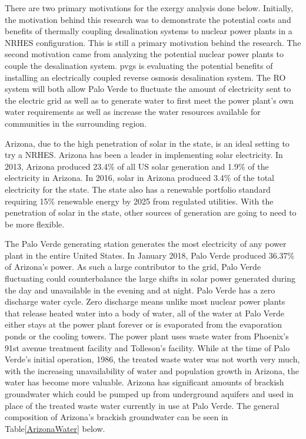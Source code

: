 \documentclass[12pt]{UIdahoMastersThesis}
\begin{document}
There are two primary motivations for the exergy analysis done below.  Initially, the motivation behind this research was to demonstrate the potential costs and benefits of thermally coupling desalination systems to nuclear power plants in a NRHES configuration.  This is still a primary motivation behind the research.  The second motivation came from analyzing the potential nuclear power plants to couple the desalination system. \ac{pvgs} is evaluating the potential benefits of installing an electrically coupled reverse osmosis desalination system.  The RO system will both allow Palo Verde to fluctuate the amount of electricity sent to the electric grid as well as to generate water to first meet the power plant's own water requirements as well as increase the water resources available for communities in the surrounding region. 

Arizona, due to the high penetration of solar in the state, is an ideal setting to try a NRHES. Arizona has been a leader in implementing solar electricity. In 2013, Arizona produced 23.4\% of all US solar generation and 1.9\% of the electricity in Arizona.  In 2016, solar in Arizona produced 3.4\% of the total electricity for the state. The state also has a renewable portfolio standard requiring 15\% renewable energy by 2025 from regulated utilities\cite{DSIRE2017}. With the penetration of solar in the state, other sources of generation are going to need to be more flexible.  

The Palo Verde generating station generates the most electricity of any power plant in the entire United States. In January 2018, Palo Verde produced 36.37\% of Arizona's power\cite{eia2018}.  As such a large contributor to the grid, Palo Verde fluctuating could counterbalance the large shifts in solar power generated during the day and unavailable in the evening and at night. Palo Verde has a zero discharge water cycle.  Zero discharge means unlike most nuclear power plants that release heated water into a body of water, all of the water at Palo Verde either stays at the power plant forever or is evaporated from the evaporation ponds or the cooling towers.  The power plant uses waste water from Phoenix's 91st avenue treatment facility and Tolleson's facility. While at the time of Palo Verde's initial operation, 1986, the treated waste water was not worth very much, with the increasing unavailability of water and population growth in Arizona, the water has become more valuable.  Arizona has significant amounts of brackish groundwater which could be pumped up from underground aquifers and used in place of the treated waste water currently in use at Palo Verde. The general composition of Arizona's brackish groundwater can be seen in Table\ref{ArizonaWater} below.  
\end{document}
